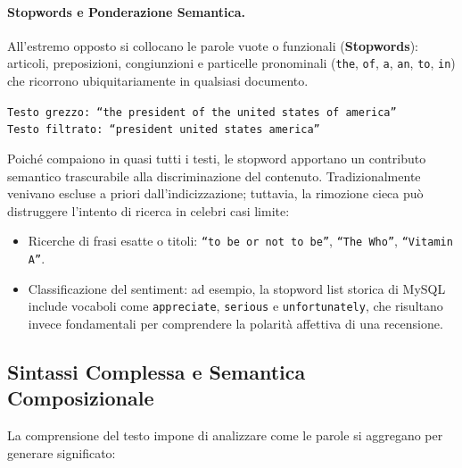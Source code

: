 \paragraph{Stopwords e Ponderazione Semantica.}
All'estremo opposto si collocano le parole vuote o funzionali (\textbf{Stopwords}): articoli, preposizioni, congiunzioni e particelle pronominali (\texttt{the}, \texttt{of}, \texttt{a}, \texttt{an}, \texttt{to}, \texttt{in}) che ricorrono ubiquitariamente in qualsiasi documento.
\begin{center}
\texttt{Testo grezzo: ``the president of the united states of america''} \\
\texttt{Testo filtrato: ``president united states america''}
\end{center}
Poiché compaiono in quasi tutti i testi, le stopword apportano un contributo semantico trascurabile alla discriminazione del contenuto. Tradizionalmente venivano escluse a priori dall'indicizzazione; tuttavia, la rimozione cieca pu\`o distruggere l'intento di ricerca in celebri casi limite:
\begin{itemize}
    \item Ricerche di frasi esatte o titoli: \texttt{``to be or not to be''}, \texttt{``The Who''}, \texttt{``Vitamin A''}.
    \item Classificazione del sentiment: ad esempio, la stopword list storica di MySQL include vocaboli come \texttt{appreciate}, \texttt{serious} e \texttt{unfortunately}, che risultano invece fondamentali per comprendere la polarit\`a affettiva di una recensione.
\end{itemize}

\FloatBarrier
\subsection{Sintassi Complessa e Semantica Composizionale}
\label{subsec:sintassi-semantica-composizionale}

La comprensione del testo impone di analizzare come le parole si aggregano per generare significato:

